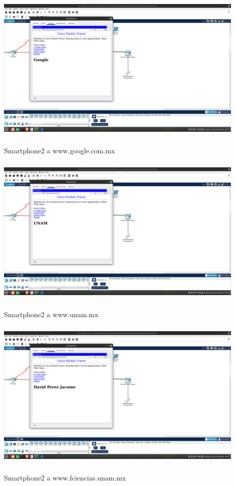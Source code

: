\documentclass[14pt]{book}
\begin{document}
\includegraphics[width=12cm, height=8cm]{images/captura5.png}Smartphone2 a www.google.com.mx\\

\includegraphics[width=12cm, height=8cm]{images/captura6.png}Smartphone2 a www.unam.mx\\

\includegraphics[width=12cm, height=8cm]{images/captura7 .png}Smartphone2 a www.fciencias.unam.mx\\
\end{document}
